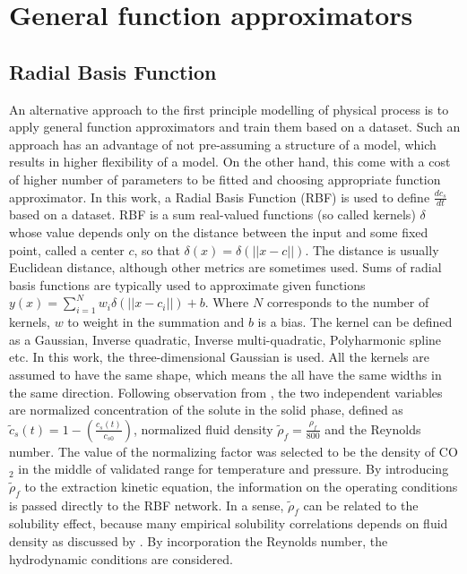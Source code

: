 \documentclass[../Article_Model_Parameters.tex]{subfiles}
\begin{document}
	
	\section{General function approximators} \label{CH: RBF}
	
	\subsection{Radial Basis Function}
	
	An alternative approach to the first principle modelling of physical process is to apply general function approximators and train them based on a dataset. Such an approach has an advantage of not pre-assuming a structure of a model, which results in higher flexibility of a model. On the other hand, this come with a cost of higher number of parameters to be fitted and choosing appropriate function approximator. In this work, a Radial Basis Function (RBF) is used to define $\frac{dc_s}{dt}$ based on a dataset. RBF is a sum real-valued functions (so called kernels) $\delta$ whose value depends only on the distance between the input and some fixed point, called a center $c$, so that $\delta(x) = \delta(||x-c||)$. The distance is usually Euclidean distance, although other metrics are sometimes used. Sums of radial basis functions are typically used to approximate given functions $y(x) = \sum_{i=1}^{N} w_i \delta(||x-c_i||) + b$. Where $N$ corresponds to the number of kernels, $w$ to weight in the summation and $b$ is a bias. The kernel can be defined as a Gaussian, Inverse quadratic, Inverse multi-quadratic, Polyharmonic spline etc. In this work, the three-dimensional Gaussian is used. All the kernels are assumed to have the same shape, which means the all have the same widths in the same direction.
	Following observation from \citet{Sliczniuk2024}, the two independent variables are normalized concentration of the solute in the solid phase, defined as $\tilde{c}_s(t) = 1 - \left(\frac{c_s(t)}{c_{s0}}\right)$, normalized fluid density $\tilde{\rho}_f = \frac{\rho_f}{800}$ and the Reynolds number. The value of the normalizing factor was selected to be the density of CO$_2$ in the middle of validated range for temperature and pressure. By introducing $\tilde{\rho}_f$ to the extraction kinetic equation, the information on the operating conditions is passed directly to the RBF network. In a sense, $\tilde{\rho}_f$ can be related to the solubility effect, because many empirical solubility correlations depends on fluid density as discussed by \citet{Antonie2019}. By incorporation the Reynolds number, the hydrodynamic conditions are considered.
	
\end{document}
